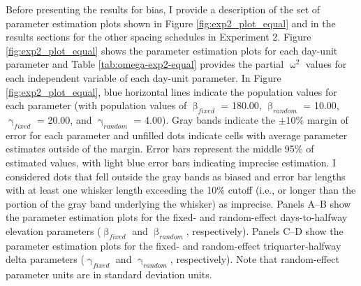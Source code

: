 \documentclass[
12pt, %
twoside,
english]{guelphthesis}
\theoremstyle{definition}
\theoremstyle{definition}
\theoremstyle{definition}
\theoremstyle{definition}
\theoremstyle{remark}
\begin{document}
Before presenting the results for bias, I provide a description of the set of parameter estimation plots shown in Figure \ref{fig:exp2_plot_equal} and in the results sections for the other spacing schedules in Experiment 2. Figure \ref{fig:exp2_plot_equal} shows the parameter estimation plots for each day-unit parameter and Table \ref{tab:omega-exp2-equal} provides the partial \(\upomega^2\) values for each independent variable of each day-unit parameter. In Figure \ref{fig:exp2_plot_equal}, blue horizontal lines indicate the population values for each parameter (with population values of \(\upbeta_{fixed}\) = 180.00, \(\upbeta_{random}\) = 10.00, \(\upgamma_{fixed}\) = 20.00, and \(\upgamma_{random}\) = 4.00). Gray bands indicate the \(\pm 10\%\) margin of error for each parameter and unfilled dots indicate cells with average parameter estimates outside of the margin. Error bars represent the middle 95\% of estimated values, with light blue error bars indicating imprecise estimation. I considered dots that fell outside the gray bands as biased and error bar lengths with at least one whisker length exceeding the 10\% cutoff (i.e., or longer than the portion of the gray band underlying the whisker) as imprecise. Panels A--B show the parameter estimation plots for the fixed- and random-effect days-to-halfway elevation parameters (\(\upbeta_{fixed}\) and \(\upbeta_{random}\), respectively). Panels C--D show the parameter estimation plots for the fixed- and random-effect triquarter-halfway delta parameters (\(\upgamma_{fixed}\) and \(\upgamma_{random}\), respectively). Note that random-effect parameter units are in standard deviation units.
\end{document}
